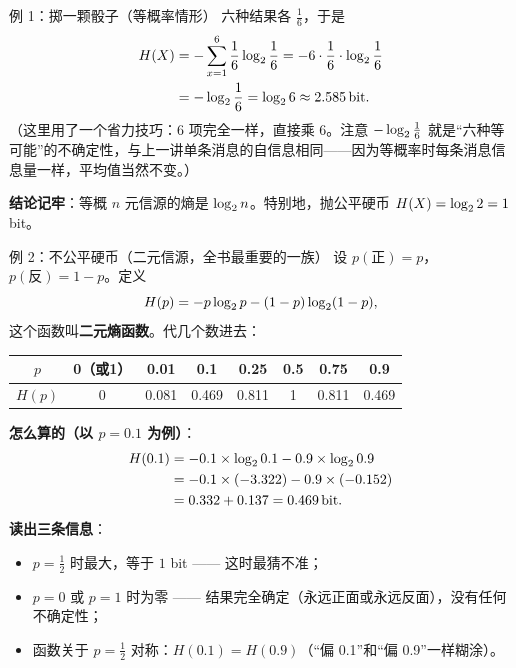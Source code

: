 \begin{calc}{例 1：掷一颗骰子（等概率情形）}
六种结果各 $\frac16$，于是
\begin{align*}
H\!\left(X\right)&=-\sum_{x=1}^{6}\frac16\log_{2}\frac16
=-6\cdot\frac16\cdot\log_{2}\frac16\\
&=-\log_{2}\frac16=\log_{2} 6\approx2.585\,\text{bit} .
\end{align*}
（这里用了一个省力技巧：$6$ 项完全一样，直接乘 $6$。注意 $-\log_{2}\frac16$ 就是“六种等可能”的不确定性，与上一讲单条消息的自信息相同——因为等概率时每条消息信息量一样，平均值当然不变。）

\textbf{结论记牢}：等概 $n$ 元信源的熵是 $\log_{2} n$。特别地，抛公平硬币 $H\!\left(X\right)=\log_{2}2=1$ bit。
\end{calc}

\begin{calc}{例 2：不公平硬币（二元信源，全书最重要的一族）}
设 $p(\text{正})=p$，$p(\text{反})=1-p$。定义
\[
H(p)=-p\log_{2} p-(1-p)\log_{2}(1-p),
\]
这个函数叫\textbf{二元熵函数}。代几个数进去：
\begin{center}
\renewcommand{\arraystretch}{1.25}
\begin{tabular}{c|ccccccc}
\toprule
$p$ & 0（或1） & 0.01 & 0.1 & 0.25 & 0.5 & 0.75 & 0.9\\
\midrule
$H(p)$ & 0 & 0.081 & 0.469 & 0.811 & 1 & 0.811 & 0.469\\
\bottomrule
\end{tabular}
\end{center}
\textbf{怎么算的（以 $p=0.1$ 为例）}：
\begin{align*}
H(0.1)&=-0.1\times\log_{2}0.1-0.9\times\log_{2}0.9\\
&=-0.1\times(-3.322)-0.9\times(-0.152)\\
&=0.332+0.137=0.469\,\text{bit} .
\end{align*}
\textbf{读出三条信息}：
\begin{itemize}[leftmargin=1.6em,itemsep=1pt,topsep=1pt]
  \item $p=\frac12$ 时最大，等于 $1$ bit —— 这时最猜不准；
  \item $p=0$ 或 $p=1$ 时为零 —— 结果完全确定（永远正面或永远反面），没有任何不确定性；
  \item 函数关于 $p=\frac12$ 对称：$H(0.1)=H(0.9)$（“偏 0.1”和“偏 0.9”一样糊涂）。
\end{itemize}
\end{calc}

